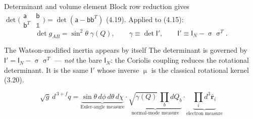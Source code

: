 \documentclass[aspectratio=169,10pt]{beamer}
\newcommand{\Mmu}{\upmu}        %
\newcommand{\Msig}{\upsigma}    %
\newcommand{\stagenum}{0}
\newcommand{\setstage}[1]{\renewcommand{\stagenum}{#1}}
\begin{document}

\begin{frame}{Determinant and volume element}
\setstage{3}
Block row reduction gives $\det\bigl(\begin{smallmatrix}\mathsf a&\mathsf b\\ \mathsf b^{T}&\mathbb 1\end{smallmatrix}\bigr)=\det(\mathsf a-\mathsf b\mathsf b^{T})$ (4.19). Applied to (4.15):
\begin{equation*}
\boxed{\;\det g_{AB}=\sin^2\!\theta\;\gamma(Q),\qquad
\gamma\equiv\det\mathsf I',\qquad
\mathsf I'\equiv\mathsf I_N-\Msig\Msig^{T}.\;}\tag{4.20}
\end{equation*}
\begin{block}{The Watson-modified inertia appears by itself}
The determinant is governed by $\mathsf I'=\mathsf I_N-\Msig\Msig^{T}$ --- \emph{not} the bare $\mathsf I_N$: the Coriolis coupling reduces the rotational determinant. It is the same $\mathsf I'$ whose inverse $\Mmu$ is the classical rotational kernel (3.20).
\end{block}
\begin{equation*}
\sqrt{g}\,d^{\,3+f}q=\underbrace{\sin\theta\,d\phi\,d\theta\,d\chi}_{\text{Euler-angle measure}}\cdot\underbrace{\sqrt{\gamma(Q)}\,\textstyle\prod_bdQ_b}_{\text{normal-mode measure}}\cdot\underbrace{\textstyle\prod_id^3\bar{\mathbf r}_i}_{\text{electron measure}} \tag{4.21}
\end{equation*}
\end{frame}
\end{document}
